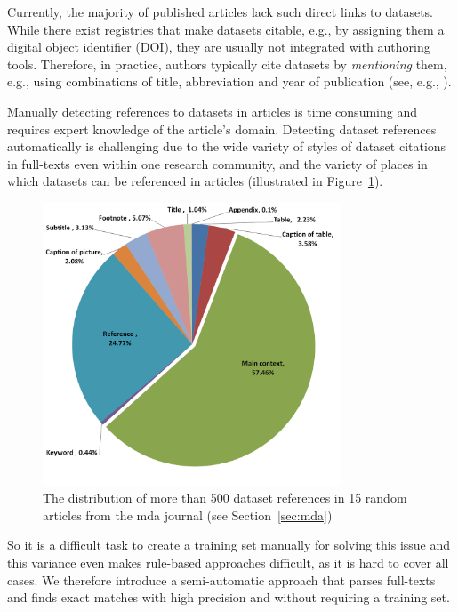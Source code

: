 \documentclass{IOS-Book-Article}
\begin{document}
Currently, the majority of published articles lack such direct links to datasets.
While there exist registries that make datasets citable, e.g., by assigning them a digital object identifier (DOI), they are usually not integrated with authoring tools.
Therefore, in practice, authors typically cite datasets by \emph{mentioning} them, e.g., using  
combinations of title, abbreviation and year of publication (see, e.g., \citet{Mathiak2015}).  

Manually detecting references to datasets in articles is time consuming and requires expert knowledge of the article's domain. 
Detecting dataset references automatically is challenging 
due to the wide variety of styles of dataset citations in full-texts even within one research community, and the variety
of places in which datasets can be referenced in articles  
(illustrated in Figure~\ref{fig:places-example}).  
\begin{figure}[h]
	\centering
	\includegraphics[width=3.5in]{DistPlaces4.PNG}
	\caption{The distribution of more than 500 dataset references in 15 random articles from the mda journal (see Section~\ref{sec:mda})}
	\label{fig:places-example}
\end{figure}
So it is a difficult task to create a training set manually for solving this issue and this variance even makes rule-based approaches difficult, as it is hard to cover all cases.
We therefore introduce a semi-automatic approach that parses full-texts and finds exact matches with high precision and without requiring a training set. 
\end{document}
